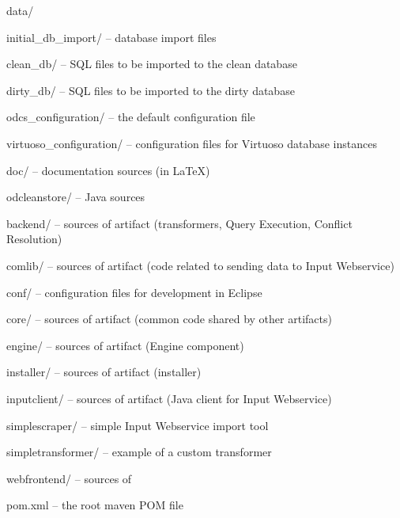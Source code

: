\begin{dirlistbrief}
	\item[data/] \mbox{}
		\begin{dirlistbrief}
			\item[initial\_db\_import/] -- database import files
				\begin{dirlistbrief}
					\item[clean\_db/] -- SQL files to be imported to the clean database
					\item[dirty\_db/] -- SQL files to be imported to the dirty database
				\end{dirlistbrief}
			\item[odcs\_configuration/] -- the default \odcs configuration file
			\item[virtuoso\_configuration/] -- configuration files for Virtuoso database instances
		\end{dirlistbrief}
	\item[doc/] -- documentation sources (in \LaTeX)
	\item[odcleanstore/] -- Java sources
		\begin{dirlistbrief}
			\item[backend/] -- sources of  artifact (transformers, Query Execution, Conflict Resolution)
			\item[comlib/] -- sources of  artifact (code related to sending data to Input Webservice)
			\item[conf/] -- configuration files for development in Eclipse
			\item[core/] -- sources of  artifact (common code shared by other artifacts)
			\item[engine/]  -- sources of  artifact (Engine component)
			\item[installer/] -- sources of  artifact (\odcs installer)
			\item[inputclient/]  -- sources of  artifact (Java client for Input Webservice)
			\item[simplescraper/]  -- simple Input Webservice import tool
			\item[simpletransformer/]  -- example of a custom transformer
			\item[webfrontend/]  -- sources of \FE
			\item[pom.xml] -- the root maven POM file
		\end{dirlistbrief}
\end{dirlistbrief}


